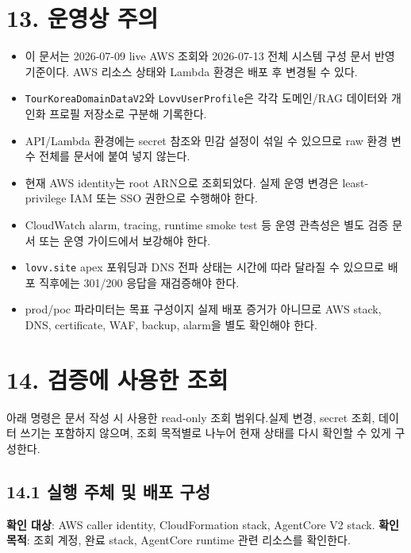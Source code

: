 \documentclass[12pt,a4paper]{article}
\newcommand{\DocNeedspace}[1]{\par\ifdim\dimexpr\pagegoal-\pagetotal\relax<#1\newpage\fi}
\newcommand{\TocNoChildTight}{\vspace{-0.28em}}
\begin{document}
\DocNeedspace{10\baselineskip}
\section*{13. 운영상 주의}
\addtocontents{toc}{\protect\TocNoChildTight}


\begin{itemize}
\item 이 문서는 2026-07-09 live AWS 조회와 2026-07-13 전체 시스템 구성 문서 반영 기준이다. AWS 리소스 상태와 Lambda 환경은 배포 후 변경될 수 있다.
\item \texttt{Tour\allowbreak{}Korea\allowbreak{}Domain\allowbreak{}Data\allowbreak{}V2}와 \texttt{Lovv\allowbreak{}User\allowbreak{}Profile}은 각각 도메인/RAG 데이터와 개인화 프로필 저장소로 구분해 기록한다.
\item API/Lambda 환경에는 secret 참조와 민감 설정이 섞일 수 있으므로 raw 환경 변수 전체를 문서에 붙여 넣지 않는다.
\item 현재 AWS identity는 root ARN으로 조회되었다. 실제 운영 변경은 least-privilege IAM 또는 SSO 권한으로 수행해야 한다.
\item CloudWatch alarm, tracing, runtime smoke test 등 운영 관측성은 별도 검증 문서 또는 운영 가이드에서 보강해야 한다.
\item \texttt{lovv.\allowbreak{}site} apex 포워딩과 DNS 전파 상태는 시간에 따라 달라질 수 있으므로 배포 직후에는 301/200 응답을 재검증해야 한다.
\item prod/poc 파라미터는 목표 구성이지 실제 배포 증거가 아니므로 AWS stack, DNS, certificate, WAF, backup, alarm을 별도 확인해야 한다.
\end{itemize}


\newpage

\DocNeedspace{10\baselineskip}
\section*{14. 검증에 사용한 조회}
\addtocontents{toc}{\protect\TocNoChildTight}


\DocNeedspace{3\baselineskip}
아래 명령은 문서 작성 시 사용한 read-only 조회 범위다.\newline 실제 변경, secret 조회, 데이터 쓰기는 포함하지 않으며, 조회 목적별로 나누어 현재 상태를 다시 확인할 수 있게 구성한다.


\DocNeedspace{12\baselineskip}
\subsection*{14.1 실행 주체 및 배포 구성}
\textbf{확인 대상}: AWS caller identity, CloudFormation stack, AgentCore V2 stack.\newline
\textbf{확인 목적}: 조회 계정, 완료 stack, AgentCore runtime 관련 리소스를 확인한다.
\end{document}
